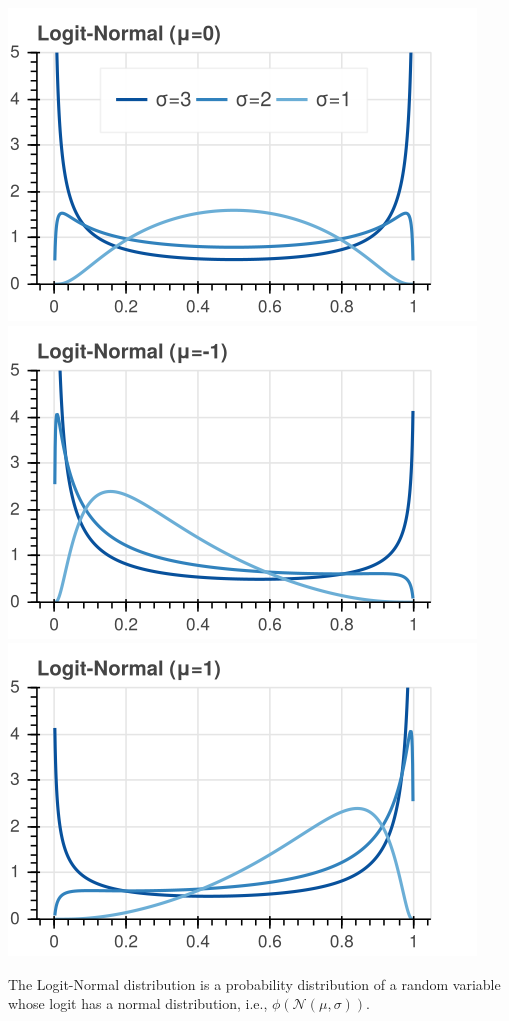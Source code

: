 \documentclass[nobib]{tufte-handout}
\begin{document}
\begin{marginfigure}[2em]
\includegraphics[width=\columnwidth]{img/logit_normal_0.png}
\includegraphics[width=\columnwidth]{img/logit_normal_-1.png}
\includegraphics[width=\columnwidth]{img/logit_normal_1.png}
\caption{The Logit-Normal distribution is a probability distribution of a random variable whose logit has a normal distribution, i.e., $\phi(\mathcal{N}(\mu, \sigma))$.}
\end{marginfigure}
\end{document}
